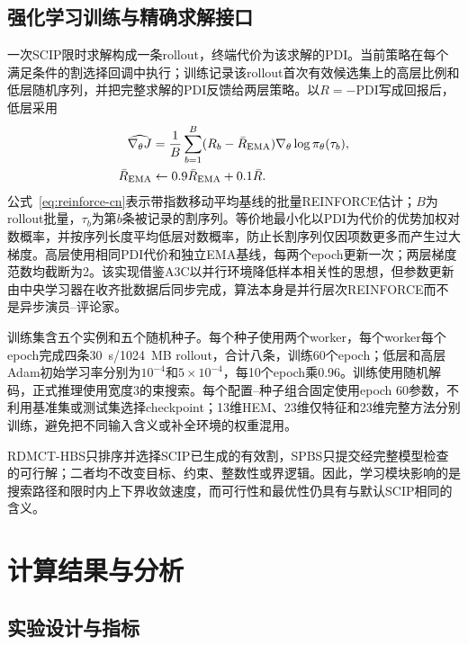 \documentclass[final,5p,times,twocolumn]{elsarticle}
\newcommand{\method}{RDMCT-HBS}
\newcommand{\pdi}{\mathrm{PDI}}
\begin{document}
\subsection{强化学习训练与精确求解接口}

一次SCIP限时求解构成一条rollout，终端代价为该求解的PDI。当前策略在每个满足条件的割选择回调中执行；训练记录该rollout首次有效候选集上的高层比例和低层随机序列，并把完整求解的PDI反馈给两层策略。以$R=-\pdi$写成回报后，低层采用
\begin{equation}
\begin{aligned}
\widehat{\nabla_\theta J}
&=\frac1B\sum_{b=1}^B(R_b-\bar R_{\rm EMA})
\nabla_\theta\log\pi_\theta(\tau_b),\\
\bar R_{\rm EMA}&\leftarrow0.9\bar R_{\rm EMA}+0.1\bar R.
\end{aligned}
\label{eq:reinforce-cn}
\end{equation}
公式~\eqref{eq:reinforce-cn}表示带指数移动平均基线的批量REINFORCE估计；$B$为rollout批量，$\tau_b$为第$b$条被记录的割序列。等价地最小化以PDI为代价的优势加权对数概率，并按序列长度平均低层对数概率，防止长割序列仅因项数更多而产生过大梯度。高层使用相同PDI代价和独立EMA基线，每两个epoch更新一次；两层梯度范数均截断为2。该实现借鉴A3C以并行环境降低样本相关性的思想，但参数更新由中央学习器在收齐批数据后同步完成，算法本身是并行层次REINFORCE而不是异步演员--评论家\citep{williams1992reinforce,mnih2016a3c}。

训练集含五个实例和五个随机种子。每个种子使用两个worker，每个worker每个epoch完成四条30~s/1024~MB rollout，合计八条，训练60个epoch；低层和高层Adam初始学习率分别为$10^{-4}$和$5\times10^{-4}$，每10个epoch乘0.96。训练使用随机解码，正式推理使用宽度3的束搜索。每个配置--种子组合固定使用epoch 60参数，不利用基准集或测试集选择checkpoint；13维HEM、23维仅特征和23维完整方法分别训练，避免把不同输入含义或补全环境的权重混用。

\method{}只排序并选择SCIP已生成的有效割，SPBS只提交经完整模型检查的可行解；二者均不改变目标、约束、整数性或界逻辑。因此，学习模块影响的是搜索路径和限时内上下界收敛速度，而可行性和最优性仍具有与默认SCIP相同的含义。

\section{计算结果与分析}

\subsection{实验设计与指标}
\end{document}
